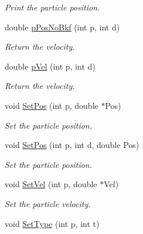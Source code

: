 \begin{DoxyCompactItemize}
\begin{DoxyCompactList}\small\item\em Print the particle position. \end{DoxyCompactList}\item 
double \hyperlink{classVarData_a24a0a89ff0f65b56c0f30a6949d56449}{p\+Pos\+No\+Bkf} (int p, int d)\hypertarget{classVarData_a24a0a89ff0f65b56c0f30a6949d56449}{}\label{classVarData_a24a0a89ff0f65b56c0f30a6949d56449}

\begin{DoxyCompactList}\small\item\em Return the velocity. \end{DoxyCompactList}\item 
double \hyperlink{classVarData_af437e6050bc54d9934ce8e41d4e14af0}{p\+Vel} (int p, int d)\hypertarget{classVarData_af437e6050bc54d9934ce8e41d4e14af0}{}\label{classVarData_af437e6050bc54d9934ce8e41d4e14af0}

\begin{DoxyCompactList}\small\item\em Return the velocity. \end{DoxyCompactList}\item 
void \hyperlink{classVarData_a5b8f787336ad1a776f82be0a59c9f570}{Set\+Pos} (int p, double $\ast$Pos)\hypertarget{classVarData_a5b8f787336ad1a776f82be0a59c9f570}{}\label{classVarData_a5b8f787336ad1a776f82be0a59c9f570}

\begin{DoxyCompactList}\small\item\em Set the particle position. \end{DoxyCompactList}\item 
void \hyperlink{classVarData_a4138dc5653572cfd0e241d4a20da623c}{Set\+Pos} (int p, int d, double Pos)\hypertarget{classVarData_a4138dc5653572cfd0e241d4a20da623c}{}\label{classVarData_a4138dc5653572cfd0e241d4a20da623c}

\begin{DoxyCompactList}\small\item\em Set the particle position. \end{DoxyCompactList}\item 
void \hyperlink{classVarData_ae8d1cbd45a41409d2a76e73738003744}{Set\+Vel} (int p, double $\ast$Vel)\hypertarget{classVarData_ae8d1cbd45a41409d2a76e73738003744}{}\label{classVarData_ae8d1cbd45a41409d2a76e73738003744}

\begin{DoxyCompactList}\small\item\em Set the particle velocity. \end{DoxyCompactList}\item 
void \hyperlink{classVarData_a54f680d04a52452baf2d8e9852c425cd}{Set\+Type} (int p, int t)\hypertarget{classVarData_a54f680d04a52452baf2d8e9852c425cd}{}\label{classVarData_a54f680d04a52452baf2d8e9852c425cd}


\end{DoxyCompactItemize}
